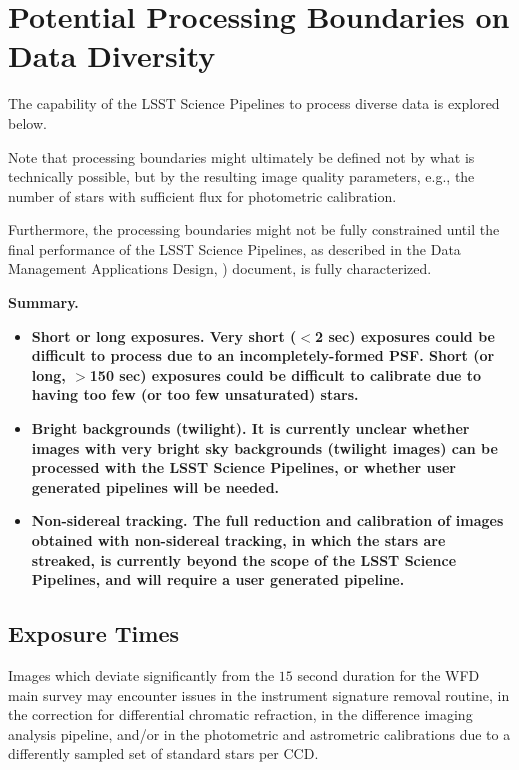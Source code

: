 \section{Potential Processing Boundaries on Data Diversity}\label{sec:procbounds}

The capability of the LSST Science Pipelines to process diverse data is explored below.

Note that processing boundaries might ultimately be defined not by what is technically 
possible, but by the resulting image quality parameters, e.g., the number of stars with 
sufficient flux for photometric calibration.

Furthermore, the processing boundaries might not be fully constrained until the final 
performance of the LSST Science Pipelines, as described in the Data Management 
Applications Design, ) document, is fully characterized.

{\bf Summary.}\\

\begin{itemize}
\item \bf{Short or long exposures.} Very short ($<$2 sec) exposures could be difficult to 
process due to an incompletely-formed PSF. Short (or long, $>$150 sec) exposures 
could be difficult to calibrate due to having too few (or too few unsaturated) stars.
\item \bf{Bright backgrounds (twilight).} It is currently unclear whether images with very 
bright sky backgrounds (twilight images) can be processed with the LSST Science Pipelines, 
or whether user generated pipelines will be needed.
\item \bf{Non-sidereal tracking.} The full reduction and calibration of images obtained 
with non-sidereal tracking, in which the stars are streaked, is currently beyond the scope 
of the LSST Science Pipelines, and will require a user generated pipeline.
\end{itemize}


\subsection{Exposure Times}\label{ssec:procbounds_expt}

Images which deviate significantly from the $15$ second duration for the WFD main survey 
may encounter issues in the instrument signature removal routine, in the correction for 
differential chromatic refraction, in the difference imaging analysis pipeline, and/or in 
the photometric and astrometric calibrations due to a differently sampled set of standard 
stars per CCD.


